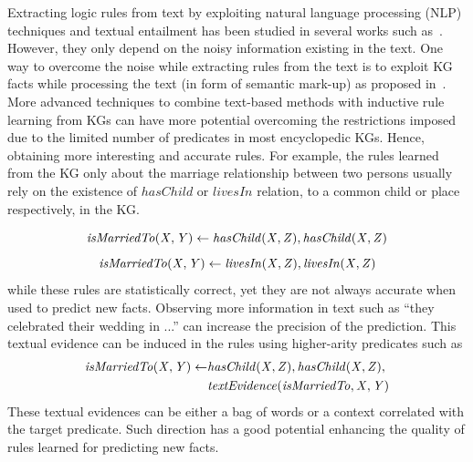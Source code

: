  Extracting logic rules from text by exploiting natural language processing (NLP) techniques and textual entailment has been studied in several works such as~\cite{Schoenmackers:2010,Gordon:2011,dragoni2016}. However, they only depend on the noisy information existing in the text. One way to overcome the noise while extracting rules from the text is to exploit KG facts while processing the text (\ie in form of semantic mark-up) as proposed in~\cite{Aitken2002}. More advanced techniques to combine 
text-based methods with inductive rule learning from KGs %
can have more potential  
 overcoming the restrictions imposed due to the limited number of predicates in most encyclopedic KGs. Hence, obtaining more interesting and accurate rules. For example, the rules learned from the KG only about the marriage relationship between two persons usually rely on the existence of $hasChild$ or $livesIn$ relation, to a common child or place respectively, in the KG.

 \[ \mathit{isMarriedTo(X,Y)} \leftarrow \mathit{hasChild(X,Z),hasChild(X,Z)}\]
 \[\mathit{isMarriedTo(X,Y)} \leftarrow \mathit{livesIn(X,Z),livesIn(X,Z)}\]
while these rules are statistically correct, yet they are not always accurate when used to predict new facts. Observing more information in text such as ``they celebrated their wedding in ...'' can increase the precision of the prediction.  This textual evidence can be induced in the rules using higher-arity predicates such as  
\begin{align*}
 \mathit{isMarriedTo(X,Y)} \leftarrow &\mathit{hasChild(X,Z),hasChild(X,Z)},\\ &\mathit{textEvidence(isMarriedTo,X,Y)}
\end{align*}
These textual evidences can be either a bag of words or a context correlated with the target predicate. Such direction has a good potential enhancing the quality of rules learned for predicting new facts.


